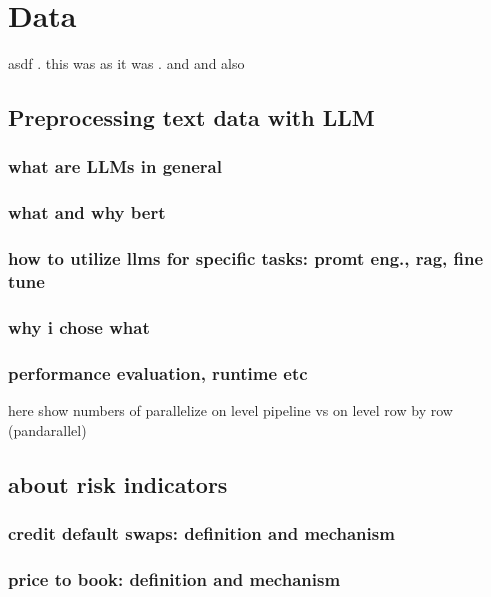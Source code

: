 \chapter{Data}\label{sec2}
\thispagestyle{empty}

asdf \cite{cathcart2020}. this was as it was \citep{cathcart2020}. and \cite{bieri2023} and also \cite{nopp2015}

\section{Preprocessing text data with LLM}

\subsection{what are LLMs in general}

\subsection{what and why bert}

\subsection{how to utilize llms for specific tasks: promt eng., rag, fine tune}

\subsection{why i chose what}

\subsection{performance evaluation, runtime etc}

here show numbers of parallelize on level pipeline vs on level row by row (pandarallel)

\section{about risk indicators}

\subsection{credit default swaps: definition and mechanism}

\subsection{price to book: definition and mechanism}

